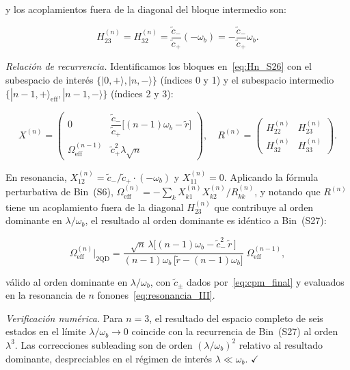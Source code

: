 \documentclass[12pt]{article}
\begin{document}
\noindent
y los acoplamientos fuera de la diagonal del bloque intermedio son:

\begin{equation}
	H^{(n)}_{23} = H^{(n)}_{32}
	= \frac{\tilde{c}_-}{\tilde{c}_+}(-\omega_b)
	= -\frac{\tilde{c}_-}{\tilde{c}_+}\omega_b.
	\label{eq:offdiag_intermedios}
\end{equation}

\medskip
\noindent
\textit{Relación de recurrencia.}
Identificamos los bloques en~\eqref{eq:Hn_S26} con el subespacio
de interés $\{|0,{+}\rangle,|n,{-}\rangle\}$ (índices 0 y 1)
y el subespacio intermedio $\{|n-1,{+}\rangle_\mathrm{eff},
|n-1,{-}\rangle\}$ (índices 2 y 3):

\begin{equation}
	X^{(n)} = \begin{pmatrix}
		0 &
		\dfrac{\tilde{c}_-}{\tilde{c}_+}\bigl[(n-1)\omega_b - \tilde{r}\bigr] \\[8pt]
		\Omega_\mathrm{eff}^{(n-1)} & \tilde{c}_+^2\lambda\sqrt{n}
	\end{pmatrix},
	\quad
	R^{(n)} = \begin{pmatrix}
		H^{(n)}_{22} & H^{(n)}_{23} \\[4pt]
		H^{(n)}_{32} & H^{(n)}_{33}
	\end{pmatrix}.
	\label{eq:XnRn}
\end{equation}

\noindent
En resonancia, $X^{(n)}_{12} = \tilde{c}_-/\tilde{c}_+ \cdot (-\omega_b)$
y $X^{(n)}_{11} = 0$. Aplicando la fórmula perturbativa de Bin~(S6),
$\Omega_\mathrm{eff}^{(n)} = -\sum_k X^{(n)}_{k1} X^{(n)}_{k2}/R^{(n)}_{kk}$,
y notando que $R^{(n)}$ tiene un acoplamiento fuera de la diagonal
$H^{(n)}_{23}$ que contribuye al orden dominante en $\lambda/\omega_b$,
el resultado al orden dominante es idéntico a Bin~(S27):

\begin{equation}
	\boxed{
		\Omega_\mathrm{eff}^{(n)}\big|_{2\mathrm{QD}}
		= \frac{\sqrt{n}\,\lambda\bigl[(n-1)\omega_b
			- \tilde{c}_-^2\,\tilde{r}\,\bigr]}
		{(n-1)\omega_b\,\bigl[\tilde{r} - (n-1)\omega_b\bigr]}
		\;\Omega_\mathrm{eff}^{(n-1)},
	}
	\label{eq:recurrencia_III}
\end{equation}

\noindent
válido al orden dominante en $\lambda/\omega_b$, con
$\tilde{c}_\pm$ dados por~\eqref{eq:cpm_final} y evaluados
en la resonancia de $n$ fonones~\eqref{eq:resonancia_III}.

\medskip
\noindent
\textit{Verificación numérica.}
Para $n=3$, el resultado del espacio completo de seis estados
en el límite $\lambda/\omega_b \to 0$ coincide con la recurrencia
de Bin~(S27) al orden $\lambda^3$. Las correcciones subleading
son de orden $(\lambda/\omega_b)^2$ relativo al resultado
dominante, despreciables en el régimen de interés
$\lambda \ll \omega_b$. $\checkmark$
\end{document}
